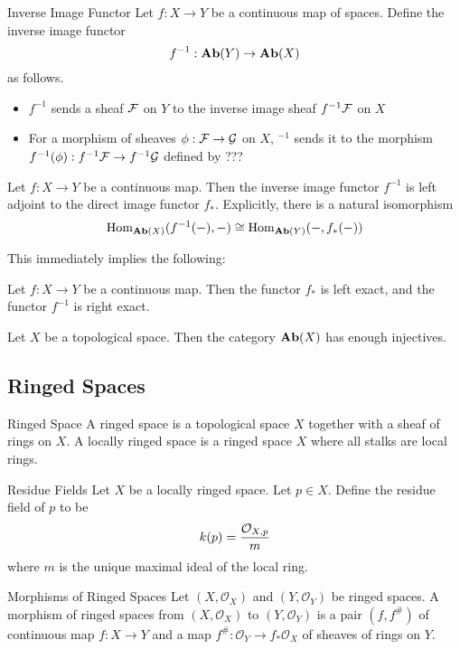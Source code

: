 \documentclass[a4paper]{article}
\begin{document}
\begin{defn}{Inverse Image Functor}{} Let $f:X\to Y$ be a continuous map of spaces. Define the inverse image functor $$f^{-1}:\bold{Ab}(Y)\to\bold{Ab}(X)$$ as follows. 
\begin{itemize}
\item $f^{-1}$ sends a sheaf $\mathcal{F}$ on $Y$ to the inverse image sheaf $f^{-1}\mathcal{F}$ on $X$
\item For a morphism of sheaves $\phi:\mathcal{F}\to\mathcal{G}$ on $X$, $^{-1}$ sends it to the morphism $f^{-1}(\phi):f^{-1}\mathcal{F}\to f^{-1}\mathcal{G}$ defined by ???
\end{itemize}
\end{defn}

\begin{thm}{}{} Let $f:X\to Y$ be a continuous map. Then the inverse image functor $f^{-1}$ is left adjoint to the direct image functor $f_\ast$. Explicitly, there is a natural isomorphism $$\operatorname{Hom}_{\bold{Ab}(X)}(f^{-1}(-),-)\cong\operatorname{Hom}_{\bold{Ab}(Y)}(-,f_\ast(-))$$
\end{thm}

This immediately implies the following: 
\begin{crl}{}{} Let $f:X\to Y$ be a continuous map. Then the functor $f_\ast$ is left exact, and the functor $f^{-1}$ is right exact. 
\end{crl}

\begin{thm}{}{} Let $X$ be a topological space. Then the category $\bold{Ab}(X)$ has enough injectives. 
\end{thm}

\subsection{Ringed Spaces}
\begin{defn}{Ringed Space}{} A ringed space is a topological space $X$ together with a sheaf of rings on $X$. A locally ringed space is a ringed space $X$ where all stalks are local rings. 
\end{defn}

\begin{defn}{Residue Fields}{} Let $X$ be a locally ringed space. Let $p\in X$. Define the residue field of $p$ to be $$k(p)=\frac{\mathcal{O}_{X,p}}{m}$$ where $m$ is the unique maximal ideal of the local ring. 
\end{defn}

\begin{defn}{Morphisms of Ringed Spaces}{} Let $(X,\mathcal{O}_X)$ and $(Y,\mathcal{O}_Y)$ be ringed spaces. A morphism of ringed spaces from $(X,\mathcal{O}_X)$ to $(Y,\mathcal{O}_Y)$ is a pair $(f,f^\#)$ of continuous map $f:X\to Y$ and a map $f^\#:\mathcal{O}_Y\to f_\ast\mathcal{O}_X$ of sheaves of rings on $Y$. 
\end{defn}
\end{document}
